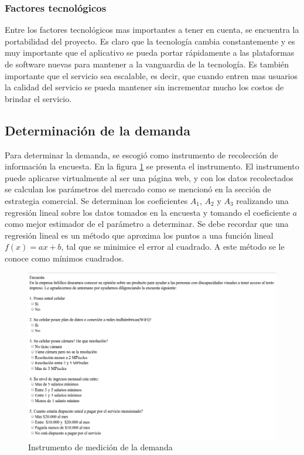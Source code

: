 \documentclass[a4paper, 12pt, oneside]{article}
\begin{document}
	\subsubsection{Factores tecnológicos}
	Entre los factores tecnológicos mas importantes a tener en cuenta, se encuentra la portabilidad del proyecto. Es claro que la tecnología cambia constantemente y es muy importante que el aplicativo se pueda portar rápidamente a las plataformas de software nuevas para mantener a la vanguardia de la tecnología. Es también importante que el servicio sea escalable, es decir, que cuando entren mas usuarios la calidad del servicio se pueda mantener sin incrementar mucho los costos de brindar el servicio.
	
	\subsection{Determinación de la demanda}
	Para determinar la demanda, se escogió como instrumento de recolección de información la encuesta. En la figura \ref{fig:encuesta} se presenta el instrumento. El instrumento puede aplicarse virtualmente al ser una página web, y con los datos recolectados se calculan los parámetros del mercado como se mencionó en la sección de estrategia comercial. Se determinan los coeficientes $A_1$, $A_2$ y $A_3$ realizando una regresión lineal sobre los datos tomados en la encuesta y tomando el coeficiente $a$ como mejor estimador de el parámetro a determinar. Se debe recordar que una regresión lineal es un método que aproxima los puntos a una función lineal $f(x) = ax + b$, tal que se minimice el error al cuadrado. A este método se le conoce como mínimos cuadrados.
	
	\begin{figure}[htb]
	\begin{center}
	\leavevmode
	\includegraphics[width=12cm]{img/encuesta.png}
	\end{center}
	\caption{Instrumento de medición de la demanda}
	\label{fig:encuesta}
	\end{figure}
	
\end{document}
